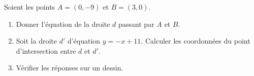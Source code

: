 
\begin{exercice}\label{exosmath-0450}

    Soient les points \( A=(0,-9)\) et \( B=(3,0)\).
    \begin{enumerate}
        \item
            Donner l'équation de la droite \( d\) passant par \( A\) et \( B\).
        \item
            Soit la droite \( d'\) d'équation \( y=-x+11\). Calculer les coordonnées du point d'intersection entre \( d\) et \( d'\).
        \item
            Vérifier les réponses sur un dessin.
    \end{enumerate}

\end{exercice}
